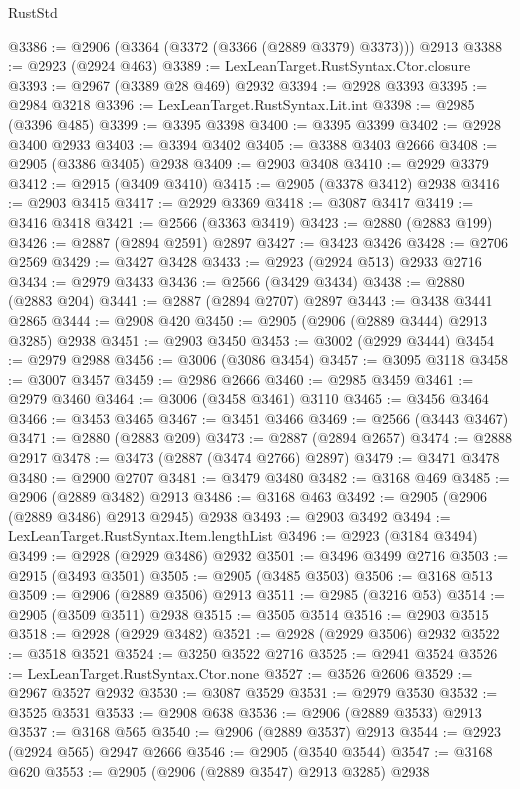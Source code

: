 \begin{lexlean}{RustStd}
\begin{coremodule}
@3386 := @2906 (@3364 (@3372 (@3366 (@2889 @3379) @3373))) @2913
@3388 := @2923 (@2924 @463)
@3389 := LexLeanTarget.RustSyntax.Ctor.closure
@3393 := @2967 (@3389 @28 @469) @2932
@3394 := @2928 @3393
@3395 := @2984 @3218
@3396 := LexLeanTarget.RustSyntax.Lit.int
@3398 := @2985 (@3396 @485)
@3399 := @3395 @3398
@3400 := @3395 @3399
@3402 := @2928 @3400 @2933
@3403 := @3394 @3402
@3405 := @3388 @3403 @2666
@3408 := @2905 (@3386 @3405) @2938
@3409 := @2903 @3408
@3410 := @2929 @3379
@3412 := @2915 (@3409 @3410)
@3415 := @2905 (@3378 @3412) @2938
@3416 := @2903 @3415
@3417 := @2929 @3369
@3418 := @3087 @3417
@3419 := @3416 @3418
@3421 := @2566 (@3363 @3419)
@3423 := @2880 (@2883 @199)
@3426 := @2887 (@2894 @2591) @2897
@3427 := @3423 @3426
@3428 := @2706 @2569
@3429 := @3427 @3428
@3433 := @2923 (@2924 @513) @2933 @2716
@3434 := @2979 @3433
@3436 := @2566 (@3429 @3434)
@3438 := @2880 (@2883 @204)
@3441 := @2887 (@2894 @2707) @2897
@3443 := @3438 @3441 @2865
@3444 := @2908 @420
@3450 := @2905 (@2906 (@2889 @3444) @2913 @3285) @2938
@3451 := @2903 @3450
@3453 := @3002 (@2929 @3444)
@3454 := @2979 @2988
@3456 := @3006 (@3086 @3454)
@3457 := @3095 @3118
@3458 := @3007 @3457
@3459 := @2986 @2666
@3460 := @2985 @3459
@3461 := @2979 @3460
@3464 := @3006 (@3458 @3461) @3110
@3465 := @3456 @3464
@3466 := @3453 @3465
@3467 := @3451 @3466
@3469 := @2566 (@3443 @3467)
@3471 := @2880 (@2883 @209)
@3473 := @2887 (@2894 @2657)
@3474 := @2888 @2917
@3478 := @3473 (@2887 (@3474 @2766) @2897)
@3479 := @3471 @3478
@3480 := @2900 @2707
@3481 := @3479 @3480
@3482 := @3168 @469
@3485 := @2906 (@2889 @3482) @2913
@3486 := @3168 @463
@3492 := @2905 (@2906 (@2889 @3486) @2913 @2945) @2938
@3493 := @2903 @3492
@3494 := LexLeanTarget.RustSyntax.Item.lengthList
@3496 := @2923 (@3184 @3494)
@3499 := @2928 (@2929 @3486) @2932
@3501 := @3496 @3499 @2716
@3503 := @2915 (@3493 @3501)
@3505 := @2905 (@3485 @3503)
@3506 := @3168 @513
@3509 := @2906 (@2889 @3506) @2913
@3511 := @2985 (@3216 @53)
@3514 := @2905 (@3509 @3511) @2938
@3515 := @3505 @3514
@3516 := @2903 @3515
@3518 := @2928 (@2929 @3482)
@3521 := @2928 (@2929 @3506) @2932
@3522 := @3518 @3521
@3524 := @3250 @3522 @2716
@3525 := @2941 @3524
@3526 := LexLeanTarget.RustSyntax.Ctor.none
@3527 := @3526 @2606
@3529 := @2967 @3527 @2932
@3530 := @3087 @3529
@3531 := @2979 @3530
@3532 := @3525 @3531
@3533 := @2908 @638
@3536 := @2906 (@2889 @3533) @2913
@3537 := @3168 @565
@3540 := @2906 (@2889 @3537) @2913
@3544 := @2923 (@2924 @565) @2947 @2666
@3546 := @2905 (@3540 @3544)
@3547 := @3168 @620
@3553 := @2905 (@2906 (@2889 @3547) @2913 @3285) @2938

\end{coremodule}
\end{lexlean}
